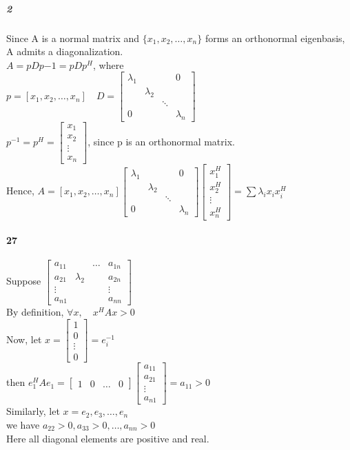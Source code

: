\documentclass[10pt,letter]{article}
\begin{document}
\subparagraph{2}
Since A is a normal matrix and $\{x_1, x_2,\dots,x_n \}$ forms an orthonormal eigenbasis, A admits a diagonalization. \\
$A=pDp{-1}=pDp^H$, where \\
$p=[x_1, x_2,\dots,x_n]\quad D=\begin{bmatrix}
\lambda_1& & &0\\
 &\lambda_2& & \\
& &\ddots& \\
0& & & \lambda_n 
\end{bmatrix}$\\
$p^{-1}=p^H=\begin{bmatrix}
x_1\\x_2\\\vdots\\x_n
\end{bmatrix}$, since p is an orthonormal matrix. \\
Hence, 
$A=[x_1, x_2,\dots,x_n]\begin{bmatrix}
\lambda_1& & &0\\
&\lambda_2& & \\
& &\ddots& \\
0& & & \lambda_n 
\end{bmatrix}\begin{bmatrix}
x_1^H\\x_2^H\\\vdots\\x_n^H
\end{bmatrix}=\sum \lambda_ix_ix_i^H$
\paragraph{27}
Suppose $\begin{bmatrix}
a_{11}& &\dots &a_{1n}\\
a_{21}&\lambda_2& &a_{2n}\\
\vdots& & &\vdots\\
a_{n1}& & & a_{nn}
\end{bmatrix}$\\ 
By definition, $\forall x, \quad x^HAx>0$\\
Now, let $x=\begin{bmatrix}
1\\0\\\vdots\\0
\end{bmatrix}=e_i^{-1}$\\
then $e_1^HAe_1=\begin{bmatrix}
1&0&\dots&0
\end{bmatrix}\begin{bmatrix}
a_{11}\\a_{21}\\\vdots\\a_{n1}
\end{bmatrix}=a_{11}>0$\\
Similarly, let $x=e_2,e_3,\dots, e_n$\\
we have $a_{22}>0, a_{33}>0,\dots,a_{nn}>0$\\
Here all diagonal elements are positive and real. 		
\end{document}
